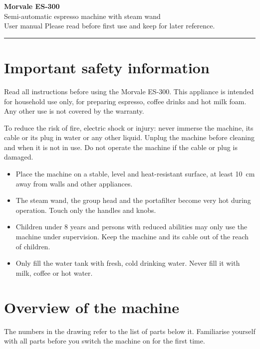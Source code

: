 \documentclass[10pt,a4paper]{article}
\begin{document}
{\Huge\bfseries\color{brand} Morvale ES-300}\\[0.2em]
{\Large Semi-automatic espresso machine with steam wand}\\[0.3em]
{\large User manual \textperiodcentered{} Please read before first use and keep for later reference.}
\vspace{0.4em}\hrule\vspace{0.3em}

\section{Important safety information}
Read all instructions before using the Morvale ES-300. This appliance is intended for household use only, for
preparing espresso, coffee drinks and hot milk foam. Any other use is not covered by the warranty.

\begin{warnbox}
To reduce the risk of fire, electric shock or injury: never immerse the machine, its cable or its plug in
water or any other liquid. Unplug the machine before cleaning and when it is not in use. Do not operate
the machine if the cable or plug is damaged.
\end{warnbox}

\begin{itemize}[leftmargin=1.4em, itemsep=0.1em]
  \item Place the machine on a stable, level and heat-resistant surface, at least \qty{10}{cm} away from walls
        and other appliances.
  \item The steam wand, the group head and the portafilter become very hot during operation. Touch only the
        handles and knobs.
  \item Children under 8 years and persons with reduced abilities may only use the machine under supervision.
        Keep the machine and its cable out of the reach of children.
  \item Only fill the water tank with fresh, cold drinking water. Never fill it with milk, coffee or hot water.
\end{itemize}

\section{Overview of the machine}
The numbers in the drawing refer to the list of parts below it. Familiarise yourself with all parts before
you switch the machine on for the first time.
\end{document}
